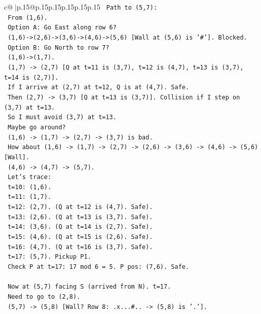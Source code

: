 \documentclass{article}
\begin{document}
{\begin{supertabular}{c@{$\;$}|p{.15\linewidth}@{}p{.15\linewidth}p{.15\linewidth}p{.15\linewidth}p{.15\linewidth}p{.15\linewidth}}
{{{\texttt{    Path to (5,7):} \\
\texttt{    From (1,6).} \\
\texttt{    Option A: Go East along row 6?} \\
\texttt{    (1,6){-}>(2,6){-}>(3,6){-}>(4,6){-}>(5,6) {[}Wall at (5,6) is '\#'{]}. Blocked.} \\
\texttt{    Option B: Go North to row 7?} \\
\texttt{    (1,6){-}>(1,7).} \\
\texttt{    (1,7) {-}> (2,7) {[}Q at t=11 is (3,7), t=12 is (4,7), t=13 is (3,7), t=14 is (2,7){]}.} \\
\texttt{    If I arrive at (2,7) at t=12, Q is at (4,7). Safe.} \\
\texttt{    Then (2,7) {-}> (3,7) {[}Q at t=13 is (3,7){]}. Collision if I step on (3,7) at t=13.} \\
\texttt{    So I must avoid (3,7) at t=13.} \\
\texttt{    Maybe go around?} \\
\texttt{    (1,6) {-}> (1,7) {-}> (2,7) {-}> (3,7) is bad.} \\
\texttt{    How about (1,6) {-}> (1,7) {-}> (2,7) {-}> (2,6) {-}> (3,6) {-}> (4,6) {-}> (5,6) {[}Wall{]}.} \\
\texttt{    (4,6) {-}> (4,7) {-}> (5,7).} \\
\texttt{    Let's trace:} \\
\texttt{    t=10: (1,6).} \\
\texttt{    t=11: (1,7).} \\
\texttt{    t=12: (2,7). (Q at t=12 is (4,7). Safe).} \\
\texttt{    t=13: (2,6). (Q at t=13 is (3,7). Safe).} \\
\texttt{    t=14: (3,6). (Q at t=14 is (2,7). Safe).} \\
\texttt{    t=15: (4,6). (Q at t=15 is (2,6). Safe).} \\
\texttt{    t=16: (4,7). (Q at t=16 is (3,7). Safe).} \\
\texttt{    t=17: (5,7). Pickup P1.} \\
\texttt{    Check P at t=17: 17 mod 6 = 5. P pos: (7,6). Safe.} \\
\\ 
\texttt{    Now at (5,7) facing S (arrived from N). t=17.} \\
\texttt{    Need to go to (2,8).} \\
\texttt{    (5,7) {-}> (5,8) {[}Wall? Row 8: .x...\#.. {-}> (5,8) is '.'{]}.} \\
}}}
\end{supertabular}}
\end{document}
